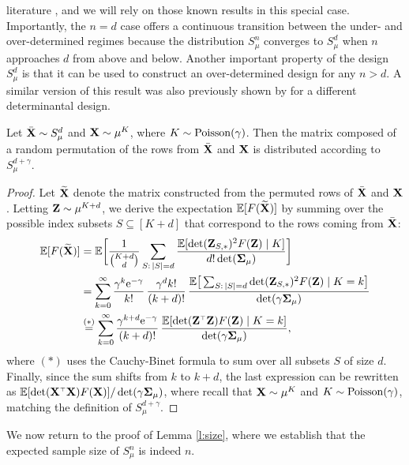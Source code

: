 \documentclass[11pt]{article}
\begin{document}
literature \cite{expected-generalized-variance,correcting-bias-journal},
and we will rely on those known results in this special case. 
Importantly, the $n=d$ case offers a continuous transition between the under-
and over-determined regimes because the distribution $S_\mu^n$
converges to $S_\mu^d$ when $n$ approaches $d$ from above and
below. Another important property of the design $S_\mu^d$ is that it
can be used to construct an over-determined design for any $n>d$. A
similar version of this result was also previously shown by
\cite{correcting-bias-journal} for a different determinantal design.
  \begin{lemma}\label{l:decomposition}
Let ${\bar{\mathbf X}}\sim S_\mu^d$ and $\mathbf X\sim \mu^K$, where
$K\sim{\operatorname{Poisson}}(\gamma)$. Then the matrix composed of a random
permutation of the rows from ${\bar{\mathbf X}}$ and $\mathbf X$ is distributed according to
$S_\mu^{d+\gamma}$.
\end{lemma}
\begin{proof}
Let $\widetilde{\mathbf{X}}$ denote the matrix constructed from the permuted rows of
${\bar{\mathbf X}}$ and $\mathbf X$.  Letting $\mathbf Z\sim\mu^{K+d}$, we derive the expectation
$\mathbb E[F(\widetilde{\mathbf{X}})]$ by summing over the possible index subsets  $S\subseteq
[K+d]$ that correspond to the rows coming from ${\bar{\mathbf X}}$:
\begin{align*}
\E[F(\Xt)] &= \E\bigg[\frac1{{K+d\choose
  d}}\sum_{S:\,|S|=d}\frac{\E[\det(\Z_{S,*})^2F(\Z)\mid
  K]}{d!\det(\Sigmab_\mu)}\bigg]\\
  &=\sum_{k=0}^\infty
    \frac{\gamma^k\ee^{-\gamma}}{k!}\,\frac{\gamma^dk!}{(k+d)!}\,
    \frac{\E\big[\sum_{S:\,|S|=d}\det(\Z_{S,*})^2F(\Z)\mid
    K=k\big]}{\det(\gamma\Sigmab_\mu)}\\
  &\overset{(*)}{=}\sum_{k=0}^\infty
    \frac{\gamma^{k+d}\ee^{-\gamma}}{(k+d)!}\,\frac{\E[\det(\Z^\top\Z)F(\Z)\mid K=k]}{\det(\gamma\Sigmab_\mu)},
\end{align*}
where $(*)$ uses the Cauchy-Binet formula to sum over all subsets $S$
of size $d$. Finally, since the sum shifts from $k$
to $k+d$, the last expression can be rewritten as
$\E[\det(\X^\top\X)F(\X)]/\det(\gamma\Sigmab_\mu)$, where recall that
$\mathbf X\sim\mu^K$ and $K\sim{\operatorname{Poisson}}(\gamma)$, matching the definition of $S_\mu^{d+\gamma}$.
\end{proof}
We now return to the proof of Lemma \ref{l:size}, where we establish
that the expected sample size of $S_\mu^n$ is indeed $n$.
\end{document}

